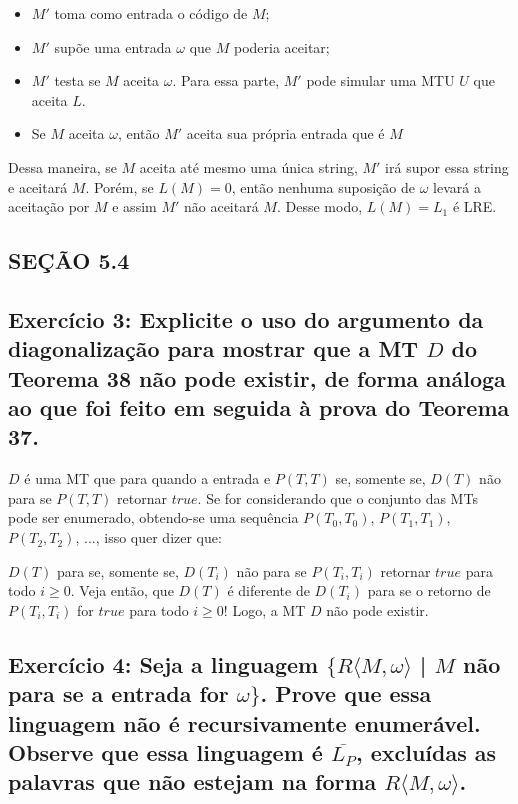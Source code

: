 \begin{itemize}
    \item $M'$ toma como entrada o código de $M$;
    \item $M'$ supõe uma entrada $\omega$ que $M$ poderia aceitar;
    \item $M'$ testa se $M$ aceita $\omega$. Para essa parte, $M'$ pode simular uma MTU $U$ que aceita $L$.
    \item Se $M$ aceita $\omega$, então $M'$ aceita sua própria entrada que é $M$
\end{itemize}

Dessa maneira, se $M$ aceita até mesmo uma única string, $M'$ irá supor essa string e aceitará $M$. Porém, se $L(M)=0$, então nenhuma suposição de $\omega$ levará a aceitação por $M$ e assim $M'$ não aceitará $M$. Desse modo, $L(M)=L_1$ é LRE.




\subsection*{SEÇÃO 5.4}
\subsection*{Exercício 3: Explicite o uso do argumento da diagonalização para mostrar que a MT $D$ do Teorema 38 não pode existir, de forma análoga ao que foi feito em seguida à prova do Teorema 37.}

$D$ é uma MT que para quando a entrada e $P(T,T)$ se, somente se, $D(T)$ não para se $P(T,T)$ retornar $true$. Se for considerando que o conjunto das MTs pode ser enumerado, obtendo-se uma sequência $P(T_0,T_0)$, $P(T_1,T_1)$, $P(T_2,T_2)$, ..., isso quer dizer que:

$D(T)$ para se, somente se, $D(T_i)$ não para se $P(T_i,T_i)$ retornar $true$ para todo $i \geq 0$. Veja então, que $D(T)$ é diferente de $D(T_i)$ para se o retorno de  $P(T_i,T_i)$ for $true$ para todo $i \geq 0$! Logo, a MT $D$ não pode existir.



\subsection*{Exercício 4: Seja a linguagem $\{R\langle M,\omega \rangle $ | $M$ não para se a entrada for $\omega \}$. Prove que essa linguagem não é recursivamente enumerável. Observe que essa linguagem é $\overline{L_P}$, excluídas as palavras que não estejam na forma $R\langle M,\omega \rangle $.}

